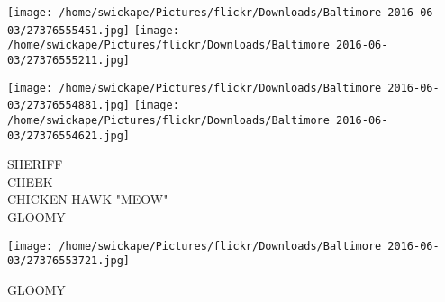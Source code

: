 \documentclass[10pt,letterpaper]{article}
\begin{document}
\texttt{[image: /home/swickape/Pictures/flickr/Downloads/Baltimore 2016-06-03/27376555451.jpg]}
\texttt{[image: /home/swickape/Pictures/flickr/Downloads/Baltimore 2016-06-03/27376555211.jpg]}

\texttt{[image: /home/swickape/Pictures/flickr/Downloads/Baltimore 2016-06-03/27376554881.jpg]}
\texttt{[image: /home/swickape/Pictures/flickr/Downloads/Baltimore 2016-06-03/27376554621.jpg]}

SHERIFF\\
CHEEK\\
CHICKEN HAWK "MEOW"\\
GLOOMY
\pagebreak

\texttt{[image: /home/swickape/Pictures/flickr/Downloads/Baltimore 2016-06-03/27376553721.jpg]}

GLOOMY
\pagebreak
\end{document}
